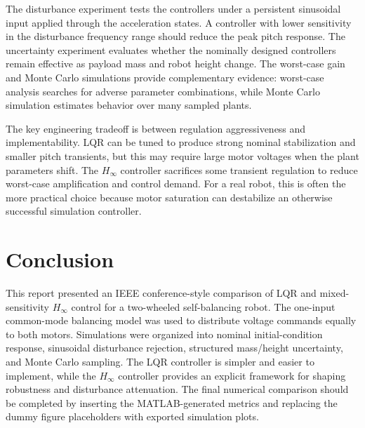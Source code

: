 \documentclass[conference]{IEEEtran}
\begin{document}
The disturbance experiment tests the controllers under a persistent sinusoidal input applied through the acceleration states. A controller with lower sensitivity in the disturbance frequency range should reduce the peak pitch response. The uncertainty experiment evaluates whether the nominally designed controllers remain effective as payload mass and robot height change. The worst-case gain and Monte Carlo simulations provide complementary evidence: worst-case analysis searches for adverse parameter combinations, while Monte Carlo simulation estimates behavior over many sampled plants.

The key engineering tradeoff is between regulation aggressiveness and implementability. LQR can be tuned to produce strong nominal stabilization and smaller pitch transients, but this may require large motor voltages when the plant parameters shift. The $H_\infty$ controller sacrifices some transient regulation to reduce worst-case amplification and control demand. For a real robot, this is often the more practical choice because motor saturation can destabilize an otherwise successful simulation controller.

\section{Conclusion}
This report presented an IEEE conference-style comparison of LQR and mixed-sensitivity $H_\infty$ control for a two-wheeled self-balancing robot. The one-input common-mode balancing model was used to distribute voltage commands equally to both motors. Simulations were organized into nominal initial-condition response, sinusoidal disturbance rejection, structured mass/height uncertainty, and Monte Carlo sampling. The LQR controller is simpler and easier to implement, while the $H_\infty$ controller provides an explicit framework for shaping robustness and disturbance attenuation. The final numerical comparison should be completed by inserting the MATLAB-generated metrics and replacing the dummy figure placeholders with exported simulation plots.
\end{document}
